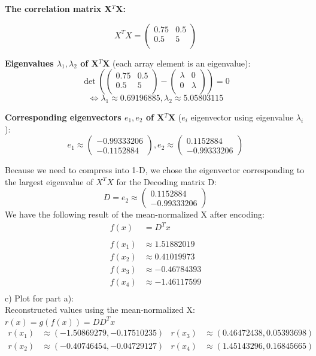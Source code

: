 \documentclass{article}
\begin{document}
\textbf{The correlation matrix X$^T$X:}

$$X^T X = 
\begin{pmatrix}
0.75 & 0.5 \\
0.5 & 5 \\
\end{pmatrix}
$$

\textbf{Eigenvalues $\lambda_1, \lambda_2$ of X$^T$X} (each array element is an eigenvalue): 
$$\det \left( 
\begin{pmatrix}
0.75 & 0.5 \\
0.5 & 5 \\
\end{pmatrix} - 
\begin{pmatrix} 
\lambda & 0 \\
0 & \lambda \\
\end{pmatrix}
 \right) = 0$$
 $$\Leftrightarrow \lambda_1 \approx 0.69196885, \lambda_2 \approx 5.05803115$$

\textbf{Corresponding eigenvectors $e_1, e_2$ of X$^T$X} ($e_i$ eigenvector using eigenvalue $\lambda_i$):
$$e_1 \approx \begin{pmatrix}-0.99333206 \\ -0.1152884\end{pmatrix}, e_2 \approx \begin{pmatrix}0.1152884 \\ -0.99333206\end{pmatrix}$$

Because we need to compress into 1-D, we chose the eigenvector corresponding to the largest eigenvalue of $X^T X$ for the Decoding matrix D:
$$D = e_2 \approx \begin{pmatrix}0.1152884 \\ -0.99333206\end{pmatrix}$$
We have the following result of the mean-normalized X after encoding: 
\begin{align*}
f(x) &= D^{T}x\\
\\
f(x_1) &\approx 1.51882019\\
f(x_2) &\approx 0.41019973\\
f(x_3) &\approx -0.46784393\\
f(x_4) &\approx -1.46117599\\
\end{align*}
\newpage
c)
Plot for part a): \\
Reconstructed values using the mean-normalized X: $r(x) = g(f(x)) = DD^T x$ \\
\begin{align*}
r(x_1) &\approx (-1.50869279, -0.17510235) & r(x_3) &\approx (0.46472438, 0.05393698)\\ 
r(x_2) &\approx (-0.40746454, -0.04729127) & r(x_4) &\approx (1.45143296, 0.16845665)
\end{align*}
\end{document}
